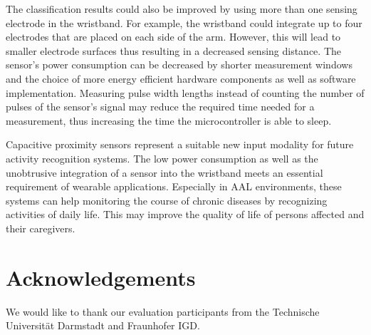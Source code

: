\documentclass[runningheads,a4paper]{llncs}
\begin{document}
The classification results could also be improved by using more than one sensing electrode in the wristband. For example, the wristband could integrate up to four electrodes that are placed on each side of the arm. However, this will lead to smaller electrode surfaces thus resulting in a decreased sensing distance. The sensor's power consumption can be decreased by shorter measurement windows and the choice of more energy efficient hardware components as well as software implementation. Measuring pulse width lengths instead of counting the number of pulses of the sensor's signal may reduce the required time needed for a measurement, thus increasing the time the microcontroller is able to sleep.

Capacitive proximity sensors represent a suitable new input modality for future activity recognition systems. The low power consumption as well as the unobtrusive integration of a sensor into the wristband meets an essential requirement of wearable applications. Especially in AAL environments, these systems can help monitoring the course of chronic diseases by recognizing activities of daily life. This may improve the quality of life of persons affected and their caregivers. 

\section*{Acknowledgements}

We would like to thank our evaluation participants from the Technische Universit\"at Darmstadt and Fraunhofer IGD.



\end{document}
